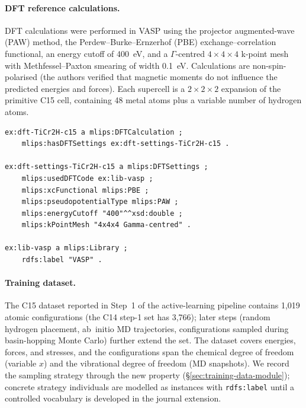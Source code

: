 \paragraph{DFT reference calculations.}
DFT calculations were performed in VASP using the projector
augmented-wave (PAW) method, the Perdew--Burke--Ernzerhof (PBE)
exchange--correlation functional, an energy cutoff of 400~eV, and a
$\Gamma$-centred $4 \times 4 \times 4$ k-point mesh with
Methfessel--Paxton smearing of width 0.1~eV. Calculations are
non-spin-polarised (the authors verified that magnetic moments do not
influence the predicted energies and forces). Each supercell is a
$2 \times 2 \times 2$ expansion of the primitive C15 cell, containing
48 metal atoms plus a variable number of hydrogen atoms.

\begin{lstlisting}[language=turtle,caption={DFT calculation and settings.}]
ex:dft-TiCr2H-c15 a mlips:DFTCalculation ;
    mlips:hasDFTSettings ex:dft-settings-TiCr2H-c15 .

ex:dft-settings-TiCr2H-c15 a mlips:DFTSettings ;
    mlips:usedDFTCode ex:lib-vasp ;
    mlips:xcFunctional mlips:PBE ;
    mlips:pseudopotentialType mlips:PAW ;
    mlips:energyCutoff "400"^^xsd:double ;
    mlips:kPointMesh "4x4x4 Gamma-centred" .

ex:lib-vasp a mlips:Library ;
    rdfs:label "VASP" .
\end{lstlisting}

\paragraph{Training dataset.}
The C15 dataset reported in Step~1 of the active-learning pipeline
contains 1{,}019 atomic configurations (the C14 step-1 set has 3{,}766);
later steps (random hydrogen placement, ab~initio MD trajectories,
configurations sampled during basin-hopping Monte Carlo) further
extend the set. The dataset covers energies, forces, and stresses, and
the configurations span the chemical degree of freedom (variable $x$)
and the vibrational degree of freedom (MD snapshots). We record the
sampling strategy through the new \samplingStrategyR{} property
(\S\ref{sec:training-data-module}); concrete strategy individuals are
modelled as instances with \texttt{rdfs:label} until a controlled
vocabulary is developed in the journal extension.

